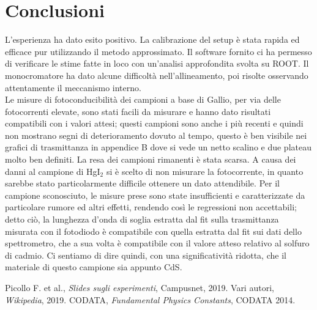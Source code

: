 \documentclass[11pt]{article} %
\begin{document}
\section*{Conclusioni}
L'esperienza ha dato esito positivo. La calibrazione del setup è stata rapida ed efficace pur utilizzando il metodo approssimato. Il software fornito ci ha permesso di verificare le stime fatte in loco con un'analisi approfondita svolta su ROOT. Il monocromatore ha dato alcune difficoltà nell'allineamento, poi risolte osservando attentamente il meccanismo interno.\\
Le misure di fotoconducibilità dei campioni a base di Gallio, per via delle fotocorrenti elevate, sono stati facili da misurare e hanno dato risultati compatibili con i valori attesi; questi campioni sono anche i più recenti e quindi non mostrano segni di deterioramento dovuto al tempo, questo è ben visibile nei grafici di trasmittanza in appendice B dove si vede un netto scalino e due plateau molto ben definiti. La resa dei campioni rimanenti è stata scarsa. A causa dei danni al campione di HgI$_2$ si è scelto di non misurare la fotocorrente, in quanto sarebbe stato particolarmente difficile ottenere un dato attendibile. Per il campione sconosciuto, le misure prese sono state insufficienti e caratterizzate da particolare rumore ed altri effetti, rendendo così le regressioni non accettabili; detto ciò, la lunghezza d'onda di soglia estratta dal fit sulla trasmittanza misurata con il fotodiodo è compatibile con quella estratta dal fit sui dati dello spettrometro, che a sua volta è compatibile con il valore atteso relativo al solfuro di cadmio. Ci sentiamo di dire quindi, con una significatività ridotta, che il materiale di questo campione sia appunto CdS.
\begin{center}
\adfopenflourishleft\quad{}\quad\adfopenflourishright
\end{center}
\begin{thebibliography}{}
 Picollo F. et al., \emph{Slides sugli esperimenti}, Campusnet, 2019.
 Vari autori, \emph{Wikipedia}, 2019.
 CODATA, \emph{Fundamental Physics Constants}, CODATA 2014.
\end{thebibliography}
\newpage
\appendix
\end{document}
